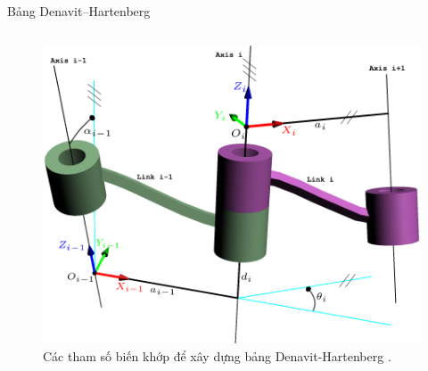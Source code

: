 \begin{frame}{Bảng Denavit–Hartenberg}
\begin{columns}
\begin{figure}
            \includegraphics[width=0.8\linewidth]{Figures/DHParameter.png}
            \caption{Các tham số biến khớp để xây dựng bảng Denavit-Hartenberg \cite{craig2011introduction}.}
            \label{fig:Denavit-Hartenberg}
        \end{figure}
    \end{columns}
    
\end{frame}